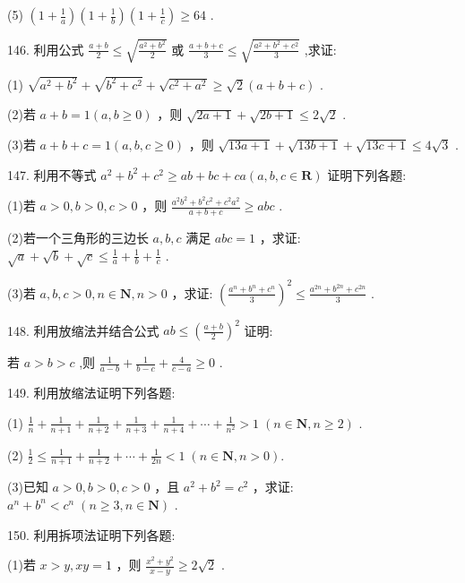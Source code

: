 \documentclass[10pt]{article}
\begin{document}
(5) \(\left( {1 + \frac{1}{a}}\right) \left( {1 + \frac{1}{b}}\right) \left( {1 + \frac{1}{c}}\right)  \geq  {64}\) .

146. 利用公式 \(\frac{a + b}{2} \leq  \sqrt{\frac{{a}^{2} + {b}^{2}}{2}}\) 或 \(\frac{a + b + c}{3} \leq  \sqrt{\frac{{a}^{2} + {b}^{2} + {c}^{2}}{3}}\) ,求证:

(1) \(\sqrt{{a}^{2} + {b}^{2}} + \sqrt{{b}^{2} + {c}^{2}} + \sqrt{{c}^{2} + {a}^{2}} \geq  \sqrt{2}\left( {a + b + c}\right)\) .

(2)若 \(a + b = 1\left( {a,b \geq  0}\right)\) ，则 \(\sqrt{{2a} + 1} + \sqrt{{2b} + 1} \leq  2\sqrt{2}\) .

(3)若 \(a + b + c = 1\left( {a,b,c \geq  0}\right)\) ，则 \(\sqrt{{13a} + 1} + \sqrt{{13b} + 1} + \sqrt{{13c} + 1} \leq  4\sqrt{3}\) .

147. 利用不等式 \({a}^{2} + {b}^{2} + {c}^{2} \geq  {ab} + {bc} + {ca}\left( {a,b,c \in  \mathbf{R}}\right)\) 证明下列各题:

(1)若 \(a > 0,b > 0,c > 0\) ，则 \(\frac{{a}^{2}{b}^{2} + {b}^{2}{c}^{2} + {c}^{2}{a}^{2}}{a + b + c} \geq  {abc}\) .

(2)若一个三角形的三边长 \(a,b,c\) 满足 \({abc} = 1\) ，求证: \(\sqrt{a} + \sqrt{b} + \sqrt{c} \leq  \frac{1}{a} + \frac{1}{b} + \frac{1}{c}\) .

(3)若 \(a,b,c > 0,n \in  \mathbf{N},n > 0\) ，求证: \({\left( \frac{{a}^{n} + {b}^{n} + {c}^{n}}{3}\right) }^{2} \leq  \frac{{a}^{2n} + {b}^{2n} + {c}^{2n}}{3}\) .

148. 利用放缩法并结合公式 \({ab} \leq  {\left( \frac{a + b}{2}\right) }^{2}\) 证明:

若 \(a > b > c\) ,则 \(\frac{1}{a - b} + \frac{1}{b - c} + \frac{4}{c - a} \geq  0\) .

149. 利用放缩法证明下列各题:

(1) \(\frac{1}{n} + \frac{1}{n + 1} + \frac{1}{n + 2} + \frac{1}{n + 3} + \frac{1}{n + 4} + \cdots  + \frac{1}{{n}^{2}} > 1\;\left( {n \in  \mathbf{N},n \geq  2}\right)\) .

(2) \(\frac{1}{2} \leq  \frac{1}{n + 1} + \frac{1}{n + 2} + \cdots  + \frac{1}{2n} < 1\;\left( {n \in  \mathbf{N},n > 0}\right) .\)

(3)已知 \(a > 0,b > 0,c > 0\) ，且 \({a}^{2} + {b}^{2} = {c}^{2}\) ，求证: \({a}^{n} + {b}^{n} < {c}^{n}\;\left( {n \geq  3,n \in  \mathbf{N}}\right)\) .

150. 利用拆项法证明下列各题:

(1)若 \(x > y,{xy} = 1\) ，则 \(\frac{{x}^{2} + {y}^{2}}{x - y} \geq  2\sqrt{2}\) .
\end{document}
